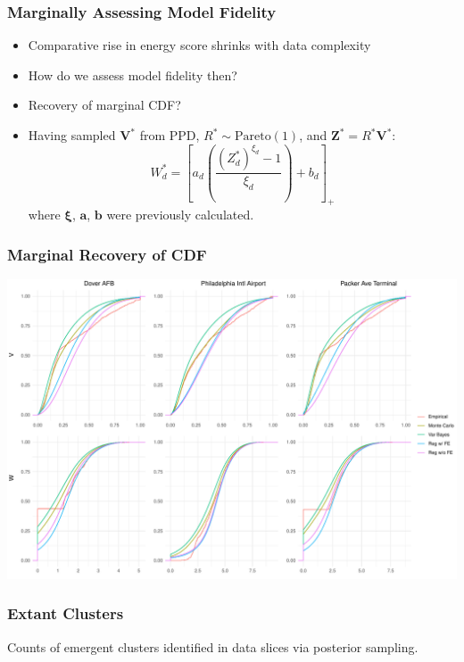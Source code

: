 \documentclass[aspectratio=169,10pt]{beamer}
\newlength{\frametextheight}
\begin{document}
\begin{frame}
    \frametitle{Marginally Assessing Model Fidelity}
    \begin{itemize}
        \item Comparative rise in energy score shrinks with data complexity
        \item How do we assess model fidelity then?
        \item Recovery of marginal CDF?
        \item Having sampled $\bm{V}^*$ from PPD, $R^*\sim\text{Pareto}(1)$, and $\bm{Z}^* = R^*\bm{V}^*$:
        \[
             W_d^* = \left[a_d\left(\frac{(Z_d^*)^{\xi_d} - 1}{\xi_d}\right) + b_d\right]_+
        \]
        where $\bm{\xi}$, $\bm{a}$, $\bm{b}$ were previously calculated.
    \end{itemize}
\end{frame} %

\begin{frame}
    \frametitle{Marginal Recovery of CDF}
    \begin{center}
        \includegraphics[height=0.99\frametextheight]{./ch3/plots/delaware_marginal_cdfs}
    \end{center}
\end{frame} %

\begin{frame}
    \frametitle{Extant Clusters}
    \begin{center}
        
    \end{center}
    {\footnotesize Counts of emergent clusters identified in data slices via posterior sampling.}
\end{frame} %
\end{document}
